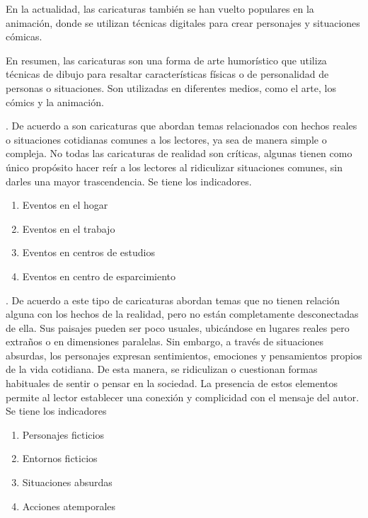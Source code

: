 \documentclass[12pt,a4paper]{article}
\begin{document}
En la actualidad, las caricaturas también se han vuelto populares en la animación, donde se utilizan técnicas digitales para crear personajes y situaciones cómicas.

En resumen, las caricaturas son una forma de arte humorístico que utiliza técnicas de dibujo para resaltar características físicas o de personalidad de personas o situaciones. Son utilizadas en diferentes medios, como el arte, los cómics y la animación.

\noindent\textbf{\dimi}. De acuerdo a \cite{gray_caricaturas_2015}
son caricaturas que abordan temas relacionados con hechos reales o situaciones cotidianas comunes a los lectores, ya sea de manera simple o compleja. No todas las caricaturas de realidad son críticas, algunas tienen como único propósito hacer reír a los lectores al ridiculizar situaciones comunes, sin darles una mayor trascendencia. Se tiene los indicadores.
\begin{enumerate}
	\item  Eventos en el hogar
	\item  Eventos en el trabajo
	\item  Eventos  en centros de estudios
	\item  Eventos en centro de esparcimiento
\end{enumerate}

\noindent\textbf{\dimii}.	De acuerdo a \cite{gray_caricaturas_2015} este tipo de caricaturas abordan temas que no tienen relación alguna con los hechos de la realidad, pero no están completamente desconectadas de ella. Sus paisajes pueden ser poco usuales, ubicándose en lugares reales pero extraños o en dimensiones paralelas. Sin embargo, a través de situaciones absurdas, los personajes expresan sentimientos, emociones y pensamientos propios de la vida cotidiana. De esta manera, se ridiculizan o cuestionan formas habituales de sentir o pensar en la sociedad. La presencia de estos elementos permite al lector establecer una conexión y complicidad con el mensaje del autor. Se tiene los indicadores
\begin{enumerate}
	\item  Personajes ficticios
	\item Entornos ficticios
	\item  Situaciones absurdas
	\item  Acciones atemporales
\end{enumerate}
\end{document}
